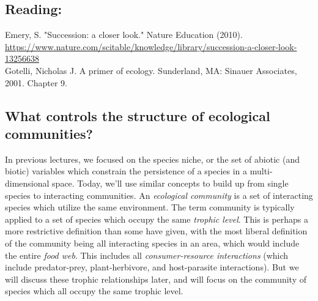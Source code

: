 \documentclass[12pt]{article}
\begin{document}
\subsection*{Reading:}

Emery, S. "Succession: a closer look." Nature Education (2010). \\ \url{https://www.nature.com/scitable/knowledge/library/succession-a-closer-look-13256638} \\

\bigskip
Gotelli, Nicholas J. A primer of ecology. Sunderland, MA: Sinauer Associates, 2001. Chapter 9.


















\begin{center}
\noindent\hrulefill 
\end{center}






\clearpage





\subsection*{What controls the structure of ecological communities?}

In previous lectures, we focused on the species niche, or the set of abiotic (and biotic) variables which constrain the persistence of a species in a multi-dimensional space. Today, we'll use similar concepts to build up from single species to interacting communities. An \textit{ecological community} is a set of interacting species which utilize the same environment. The term community is typically applied to a set of species which occupy the same \textit{trophic level}. This is perhaps a more restrictive definition than some have given, with the most liberal definition of the community being all interacting species in an area, which would include the entire \textit{food web}. This includes all \textit{consumer-resource interactions} (which include predator-prey, plant-herbivore, and host-parasite interactions). But we will discuss these trophic relationships later, and will focus on the community of species which all occupy the same trophic level. 
\end{document}
